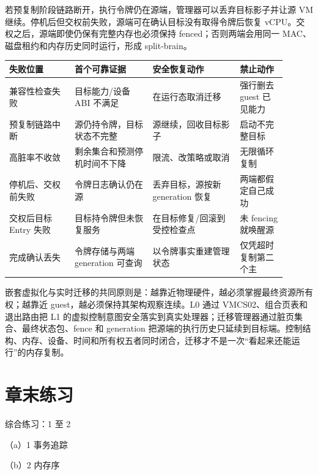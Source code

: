 
若预复制阶段链路断开，执行令牌仍在源端，管理器可以丢弃目标影子并让源 VM 继续。停机后但交权前失败，源端可在确认目标没有取得令牌后恢复 vCPU。交权之后，源端即使仍保有完整内存也必须保持 fenced；否则两端会用同一 MAC、磁盘租约和内存历史同时运行，形成 split-brain。

\begin{longtable}{L{0.21\linewidth}L{0.25\linewidth}L{0.29\linewidth}L{0.15\linewidth}}
\toprule
失败位置 & 首个可靠证据 & 安全恢复动作 & 禁止动作 \\
\midrule
兼容性检查失败 & 目标能力/设备 ABI 不满足 & 在运行态取消迁移 & 强行删去 guest 已见能力 \\\tablerowrule
预复制链路中断 & 源仍持令牌，目标状态不完整 & 源继续，回收目标影子 & 启动不完整目标 \\\tablerowrule
高脏率不收敛 & 剩余集合和预测停机时间不下降 & 限流、改策略或取消 & 无限循环复制 \\\tablerowrule
停机后、交权前失败 & 令牌日志确认仍在源 & 丢弃目标，源按新 generation 恢复 & 两端都假定自己成功 \\\tablerowrule
交权后目标 Entry 失败 & 目标持令牌但未恢复服务 & 在目标修复/回滚到受控检查点 & 未 fencing 就唤醒源 \\\tablerowrule
完成确认丢失 & 令牌存储与两端 generation 可查询 & 以令牌事实重建管理状态 & 仅凭超时复制第二个主 \\
\bottomrule
\end{longtable}

嵌套虚拟化与实时迁移的共同原则是：越靠近物理硬件，越必须掌握最终资源所有权；越靠近 guest，越必须保持其架构观察连续。L0 通过 VMCS02、组合页表和退出路由把 L1 的虚拟控制意图安全落实到真实处理器；迁移管理器通过脏页集合、最终状态包、fence 和 generation 把源端的执行历史只延续到目标端。控制结构、内存、设备、时间和所有权五者同时闭合，迁移才不是一次“看起来还能运行”的内存复制。

\section*{章末练习}

\begin{chapterexercise}{综合练习：1 至 2}
\begin{exercisesubproblem}{（a）1}
事务追踪
\end{exercisesubproblem}
\begin{exercisesubproblem}{（b）2}
内存序
\end{exercisesubproblem}
\end{chapterexercise}

